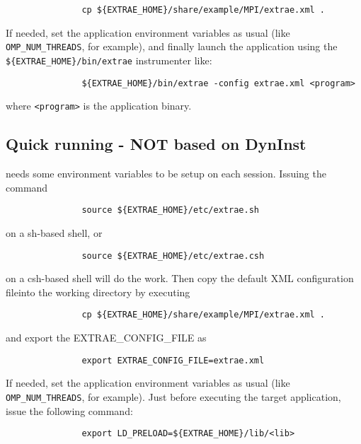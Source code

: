 \begin{verbatim}
               cp ${EXTRAE_HOME}/share/example/MPI/extrae.xml .
\end{verbatim}

If needed, set the application environment variables as usual (like {\tt OMP\_NUM\_THREADS}, for example), and finally launch the application using the {\tt \$\{EXTRAE\_HOME\}/bin/extrae} instrumenter like:

\begin{verbatim}
               ${EXTRAE_HOME}/bin/extrae -config extrae.xml <program>
\end{verbatim}

where {\tt <program>} is the application binary.

\subsection{Quick running \TRACE - NOT based on DynInst}\label{subsec:RunningTraceNOTDynInst}

\TRACE needs some environment variables to be setup on each session. Issuing the command 

\begin{verbatim}
               source ${EXTRAE_HOME}/etc/extrae.sh
\end{verbatim}

on a sh-based shell, or 

\begin{verbatim}
               source ${EXTRAE_HOME}/etc/extrae.csh
\end{verbatim}

on a csh-based shell will do the work. Then copy the default XML configuration file\footnotemark[1] into the working directory by executing

\begin{verbatim}
               cp ${EXTRAE_HOME}/share/example/MPI/extrae.xml .
\end{verbatim}

and export the {EXTRAE\_CONFIG\_FILE} as

\begin{verbatim}
               export EXTRAE_CONFIG_FILE=extrae.xml
\end{verbatim}

If needed, set the application environment variables as usual (like {\tt OMP\_NUM\_THREADS}, for example). Just before executing the target application, issue the following command:

\begin{verbatim}
               export LD_PRELOAD=${EXTRAE_HOME}/lib/<lib>
\end{verbatim}

